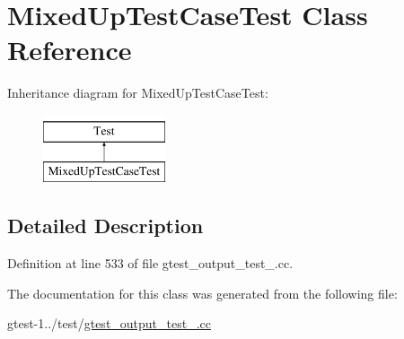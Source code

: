 \hypertarget{classbar_1_1MixedUpTestCaseTest}{\section{\-Mixed\-Up\-Test\-Case\-Test \-Class \-Reference}
\label{d7/de4/classbar_1_1MixedUpTestCaseTest}
}
\-Inheritance diagram for \-Mixed\-Up\-Test\-Case\-Test\-:\begin{figure}[H]
\begin{center}
\leavevmode
\includegraphics[height=2.000000cm]{d7/de4/classbar_1_1MixedUpTestCaseTest}
\end{center}
\end{figure}


\subsection{\-Detailed \-Description}


\-Definition at line 533 of file gtest\-\_\-output\-\_\-test\-\_\-.\-cc.



\-The documentation for this class was generated from the following file\-:\begin{DoxyCompactItemize}
\item 
gtest-\/1../test/\hyperlink{gtest__output__test___8cc}{gtest\-\_\-output\-\_\-test\-\_\-.\-cc}\end{DoxyCompactItemize}

